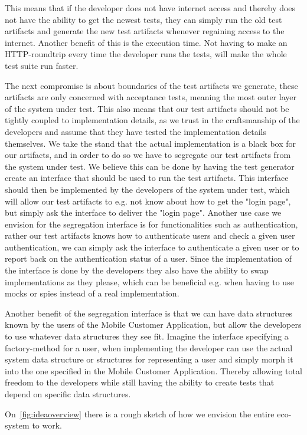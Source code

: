 This means that if the developer does not have internet access and thereby does not have the ability to get the newest tests, they can simply run the old test artifacts and generate the new test artifacts whenever regaining access to the internet. Another benefit of this is the execution time. 
Not having to make an HTTP-roundtrip every time the developer runs the tests, will make the whole test suite run faster.

The next compromise is about boundaries of the test artifacts we generate, these artifacts are only concerned with acceptance tests, meaning the most outer layer of the system under test. 
This also means that our test artifacts should not be tightly coupled to implementation details, as we trust in the craftsmanship of the developers and assume that they have tested the implementation details themselves.
We take the stand that the actual implementation is a black box for our artifacts, and in order to do so we have to segregate our test artifacts from the system under test.
We believe this can be done by having the test generator create an interface that should be used to run the test artifacts.
This interface should then be implemented by the developers of the system under test, which will allow our test artifacts to e.g. not know about how to get the "login page", but simply ask the interface to deliver the "login page".
Another use case we envision for the segregation interface is for functionalities such as authentication, rather our test artifacts knows how to authenticate users and check a given user authentication, we can simply ask the interface to authenticate a given user or to report back on the authentication status of a user.
Since the implementation of the interface is done by the developers they also have the ability to swap implementations as they please, which can be beneficial e.g. when having to use mocks or spies instead of a real implementation.

Another benefit of the segregation interface is that we can have data structures known by the users of the Mobile Customer Application, but allow the developers to use whatever data structures they see fit. Imagine the interface specifying a factory-method for a user, when implementing the developer can use the actual system data structure or structures for representing a user and simply morph it into the one specified in the Mobile Customer Application. Thereby allowing total freedom to the developers while still having the ability to create tests that depend on specific data structures.

On~\autoref{fig:ideaoverview} there is a rough sketch of how we envision the entire eco-system to work.
